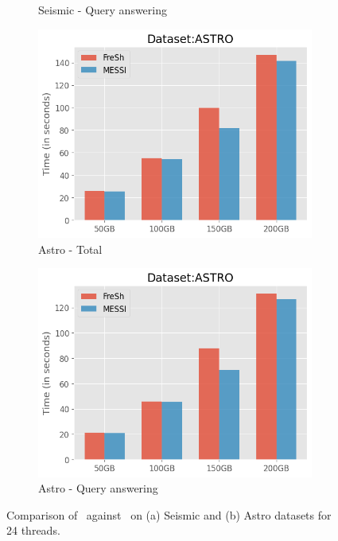 \begin{figure}[htbp]
\begin{subfigure}{0.48\textwidth}
        \caption{Seismic - Query answering}
        \label{fig:eval:scale-dataset:seismic:QueryAnswering}
    \end{subfigure}        
    \begin{subfigure}{0.48\textwidth}
        \includegraphics[width=\textwidth]{figures/Experiments/scale-dataset-astro-total.png}
        \caption{Astro - Total}
        \label{fig:eval:scale-dataset:astro:total}
    \end{subfigure}
    \begin{subfigure}{0.48\textwidth}
        \includegraphics[width=\textwidth]{figures/Experiments/scale-dataset-astro-query.png}
        \caption{Astro - Query answering}
        \label{fig:eval:scale-dataset:astro:QueryAnswering}
    \end{subfigure}    

    \caption{Comparison of \Fresh\ against \MESSI\ on (a) Seismic and (b) Astro datasets for 24 threads.}
    \label{fig:eval:scale-dataset:real}
\end{figure}

